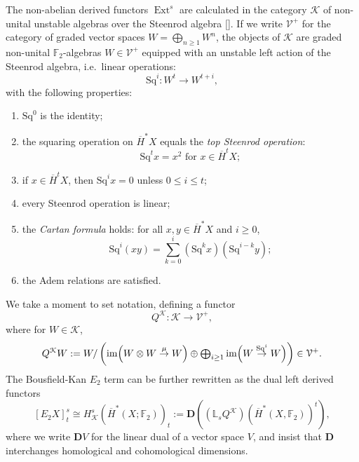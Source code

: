 \documentclass[11pt]{amsart} \renewcommand{\baselinestretch}{1.2}
\theoremstyle{plain}
\theoremstyle{definition}
\DeclareMathOperator{\Ext}{Ext}
\DeclareMathOperator{\im}{im}
\renewcommand{\to}{\longrightarrow}
\newcommand{\calV}{\mathcal{V}}
\newcommand{\cala}{\mathcal{A}}
\newcommand{\calk}{\mathcal{K}}
\newcommand{\calc}{\mathcal{C}}
\newcommand{\citeBOX}[2][]{\cite[\mbox{#1}]{#2}}
\newcommand{\vect}[2]{\calV^{#1}_{#2}}
\newcommand{\Sq}{\mathrm{Sq}}
\newcommand{\F}{\mathbb{F}}
\newcommand{\Ftwo}{\F_2}
\newcommand{\E}[5]{[E^{#1}_{#2}#3]^{#4}_{#5}}
\newcommand{\dual}{\mathbf{D}}
\begin{document}
\begin{Introduction}
The non-abelian derived functors $\Ext^s$ are calculated in the category 
%
$\calk$ of non-unital unstable algebras over the Steenrod algebra []. If we write $\vect{+}{}$ for the category of graded vector spaces $W=\textstyle \bigoplus_{n\geq 1} W^n$, the objects of $\calk$ are graded non-unital $\Ftwo$-algebras
$W\in\vect{+}{}$
equipped with an unstable left action of the Steenrod algebra, i.e.\ linear operations:
\[\Sq^i: W^t\to W^{t+i},\]
with the following properties:
\begin{enumerate}
\item $\Sq^0$ is the identity;
\item the squaring operation on $\overline{H}^*X$ equals the \emph{top Steenrod operation}:
\[\Sq^{t}x=x^{2}\text{\ \ for $x\in \overline{H}^tX$};\]
\item \label{Sq unstable vanishing intro} if $x\in \overline{H}^tX$, then $\Sq^ix=0$ unless $0\leq i\leq t$;
\item every Steenrod operation is linear;
\item the \emph{Cartan formula} holds:  for all $x,y\in   \overline{H}^*X$ and $i\geq0$,
\[\Sq^i(xy)=\textstyle\sum_{k=0}^{i}(\Sq^kx)(\Sq^{i-k}y);\]
\item the Adem relations are satisfied.
\end{enumerate}
We take a moment to set notation, defining a functor 
\[Q^{\calk}:\calk\to \vect{+}{},\]
where for $W\in\calk$, 
\[Q^{\calk}W:=W/\left(\im\Bigl(W\otimes W\overset{\mu}{\rightarrow} W\Bigr)\oplus\textstyle\bigoplus_{i\geq1}\im\Bigl(W\overset{\Sq^i}{\rightarrow} W\Bigr)\right)\in\vect{+}{}.\]
The Bousfield-Kan $E_2$ term can be further rewritten as the dual left derived functors
\[\E{}{2}{X}{s}{t}\cong H^s_{\calk}(\overline{H}^*(X;\Ftwo))_t:=\dual((\mathbb{L}_sQ^{\calk})(\overline{H}^*(X,\Ftwo) )^t),\]
where we write  $\dual V$ for the linear dual of a vector space $V$, and insist that $\dual$ interchanges homological and cohomological dimensions.




\end{Introduction}
\end{document}
